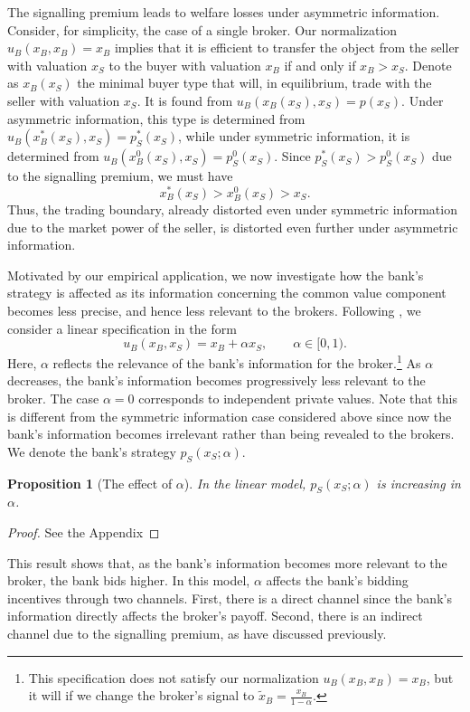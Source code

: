 \documentclass[11pt,twopage]{article}
\newtheorem{proposition}{Proposition}
{\bf}{\it}
\begin{document}
The signalling premium leads to welfare losses under asymmetric
information. Consider, for simplicity, the case of a single
broker. Our normalization $u_B(x_B,x_B) = x_B$ implies that it is
efficient to transfer the object from the seller with valuation $x_S$
to the buyer with valuation $x_B$ if and only if $x_B>x_S$. Denote as
$x_B(x_S)$ the minimal buyer type that will, in equilibrium, trade
with the seller with valuation $x_S$. It is found from
$u_B(x_B(x_S),x_S) = p(x_S)$. Under asymmetric information, this type
is determined from $u_B(x_B^*(x_S),x_S) = p_S^*(x_S)$, while under
symmetric information, it is determined from $u_B(x_B^0(x_S),x_S) =
p_S^0(x_S)$. Since $p_S^*(x_S)>p_S^0(x_S)$ due to the signalling
premium, we must have \[ x_B^*(x_S)>x_B^0(x_S)>x_S .\] Thus, the
trading boundary, already distorted even under symmetric information
due to the market power of the seller, is distorted even further under
asymmetric information.

Motivated by our empirical application, we now investigate how the
bank's strategy is affected as its information concerning the common
value component becomes less precise, and hence less relevant to the
brokers. Following \cite{cai2007reserve}, we consider a linear
specification in the form
\[ u_B(x_B,x_S) = x_B+\alpha x_S, \quad\quad \alpha \in [0,1).\] Here,
$\alpha$ reflects the relevance of the bank's information for the
broker.\footnote{This specification does not satisfy our normalization
  $u_B(x_B,x_B) = x_B$, but it will if we change the broker's signal
  to $\tilde x_B = \frac{x_B}{1-\alpha}$.}  As $\alpha$ decreases, the
bank's information becomes progressively less relevant to the
broker. The case $\alpha = 0$ corresponds to independent private
values. Note that this is different from the symmetric information
case considered above since now the bank's information becomes
irrelevant rather than being revealed to the brokers. We denote the
bank's strategy $p_S(x_S;\alpha)$.
\begin{proposition}[The effect of $\alpha$]\label{prop:slope}
  In the linear model, $p_S(x_S;\alpha)$ is increasing in $\alpha$.
\end{proposition}
\begin{proof}See the Appendix
\end{proof}
This result shows that, as the bank's information becomes more
relevant to the broker, the bank bids higher. In this model, $\alpha$
affects the bank's bidding incentives through two channels. First,
there is a direct channel since the bank's information directly
affects the broker's payoff. Second, there is an indirect channel due
to the signalling premium, as have discussed previously.
\end{document}
